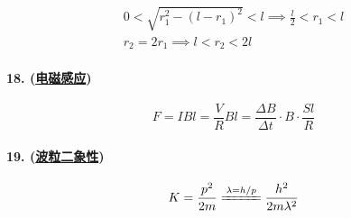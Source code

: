 \begin{gather*}
    0<\sqrt{r_1^2-(l-r_1)^2}<l\implies
    \frac{l}{2}<r_1<l\\
    r_2=2r_1\implies
    l<r_2<2l
\end{gather*}

\paragraph{18. (\hyperref[subsec:电磁感应]{电磁感应})}

\begin{equation*}
    F=IBl=\frac{V}{R}Bl=\frac{\Delta B}{\Delta t}\cdot B\cdot\frac{Sl}{R}
\end{equation*}

\paragraph{19. (\hyperref[sec:波粒二象性]{波粒二象性})}

\begin{equation*}
    K=\frac{p^2}{2m}\xlongequal{\lambda=h/p}\frac{h^2}{2m\lambda^2}
\end{equation*}
